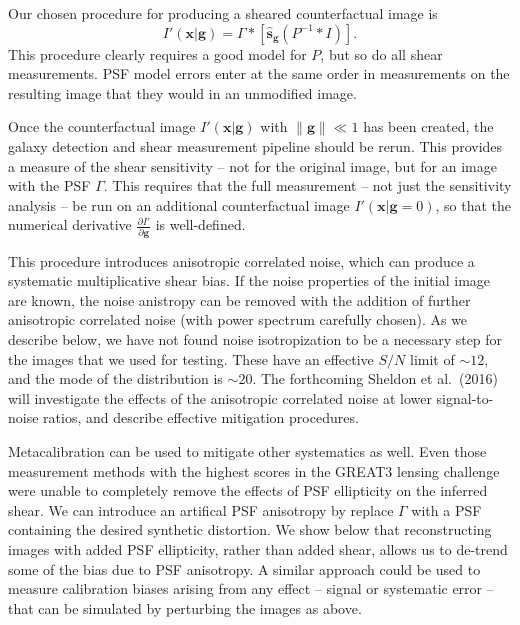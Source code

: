 \documentclass[iop]{emulateapj}
\begin{document}
Our chosen procedure for producing a sheared counterfactual image is
\begin{equation}
I'({\mathbf{x}}|\mathbf{g}) = \Gamma \ast \left[\hat{\mathbf{s}}_\mathbf{g} \left(P^{-1} \ast I \right)\right].
\end{equation}
This procedure clearly requires a good model for $P$, but so do all
shear measurements. PSF model errors enter at the
same order in measurements on the resulting image that they would in
an unmodified image.

Once the counterfactual image $I'(\mathbf{x}|\mathbf{g})$ with
$\|\mathbf{g}\| \ll 1$ has been created, the galaxy detection and
shear measurement pipeline should be rerun. This provides a measure of
the shear sensitivity -- not for the original image, but for an image
with the PSF $\Gamma$. This requires that the full measurement -- not
just the sensitivity analysis -- be run on an additional
counterfactual image $I'(\mathbf{x}|\mathbf{g}=0)$, so that the numerical
derivative $\frac{\partial I'}{\partial \mathbf{g}}$ is well-defined.

This procedure introduces anisotropic correlated noise, which can
produce a systematic multiplicative shear bias. If the noise
properties of the initial image are known, the noise anistropy can be
removed with the addition of further anisotropic correlated noise
(with power spectrum carefully chosen). As we describe below, we have
not found noise isotropization to be a necessary step for the images
that we used for testing.  These have an effective $S/N$ limit of
$\sim 12$, and the mode of the distribution is $\sim20$. The
forthcoming Sheldon et al.~(2016) will investigate the effects of the
anisotropic correlated noise at lower signal-to-noise ratios, and
describe effective mitigation procedures.

Metacalibration can be used to mitigate other systematics as
well. Even those measurement methods with the highest scores in the
GREAT3 lensing challenge were unable to completely remove the effects
of PSF ellipticity on the inferred shear. We can introduce an
artifical PSF anisotropy by replace $\Gamma$ with a PSF containing the
desired synthetic distortion.  We show below that reconstructing
images with added PSF ellipticity, rather than added shear, allows us
to de-trend some of the bias due to PSF anisotropy. A similar approach
could be used to measure calibration biases arising from any effect --
signal or systematic error -- that can be simulated by perturbing the
images as above.
\end{document}
